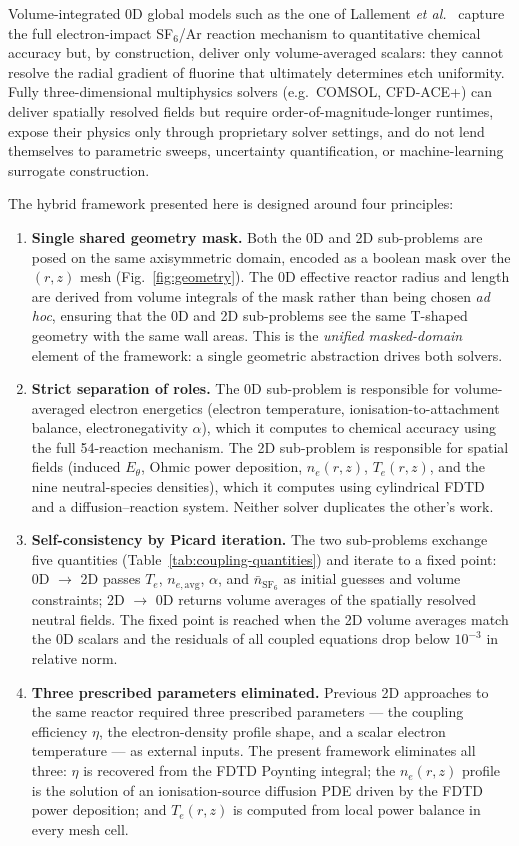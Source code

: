 \documentclass[11pt,a4paper]{report}
\newcommand{\SFsix}{\mathrm{SF}_6}
\begin{document}
Volume-integrated 0D global models such as the one of Lallement \textit{et al.}~\cite{Lallement2009} capture the full electron-impact SF$_6$/Ar reaction mechanism to quantitative chemical accuracy but, by construction, deliver only volume-averaged scalars: they cannot resolve the radial gradient of fluorine that ultimately determines etch uniformity.  Fully three-dimensional multiphysics solvers (e.g.\ COMSOL, CFD-ACE+) can deliver spatially resolved fields but require order-of-magnitude-longer runtimes, expose their physics only through proprietary solver settings, and do not lend themselves to parametric sweeps, uncertainty quantification, or machine-learning surrogate construction.

The hybrid framework presented here is designed around four principles:
\begin{enumerate}
  \item \textbf{Single shared geometry mask.}  Both the 0D and 2D sub-problems are posed on the same axisymmetric domain, encoded as a boolean mask over the $(r,z)$ mesh (Fig.~\ref{fig:geometry}).  The 0D effective reactor radius and length are derived from volume integrals of the mask rather than being chosen \emph{ad hoc}, ensuring that the 0D and 2D sub-problems see the same T-shaped geometry with the same wall areas.  This is the \emph{unified masked-domain} element of the framework: a single geometric abstraction drives both solvers.
  \item \textbf{Strict separation of roles.}  The 0D sub-problem is responsible for volume-averaged electron energetics (electron temperature, ionisation-to-attachment balance, electronegativity $\alpha$), which it computes to chemical accuracy using the full 54-reaction mechanism.  The 2D sub-problem is responsible for spatial fields (induced $E_\theta$, Ohmic power deposition, $n_e(r,z)$, $T_e(r,z)$, and the nine neutral-species densities), which it computes using cylindrical FDTD and a diffusion--reaction system.  Neither solver duplicates the other's work.
  \item \textbf{Self-consistency by Picard iteration.}  The two sub-problems exchange five quantities (Table~\ref{tab:coupling-quantities}) and iterate to a fixed point: 0D $\to$ 2D passes $T_e$, $n_{e,\mathrm{avg}}$, $\alpha$, and $\bar{n}_{\SFsix}$ as initial guesses and volume constraints; 2D $\to$ 0D returns volume averages of the spatially resolved neutral fields.  The fixed point is reached when the 2D volume averages match the 0D scalars and the residuals of all coupled equations drop below $10^{-3}$ in relative norm.
  \item \textbf{Three prescribed parameters eliminated.}  Previous 2D approaches to the same reactor required three prescribed parameters --- the coupling efficiency $\eta$, the electron-density profile shape, and a scalar electron temperature --- as external inputs.  The present framework eliminates all three: $\eta$ is recovered from the FDTD Poynting integral; the $n_e(r,z)$ profile is the solution of an ionisation-source diffusion PDE driven by the FDTD power deposition; and $T_e(r,z)$ is computed from local power balance in every mesh cell.
\end{enumerate}
\end{document}
